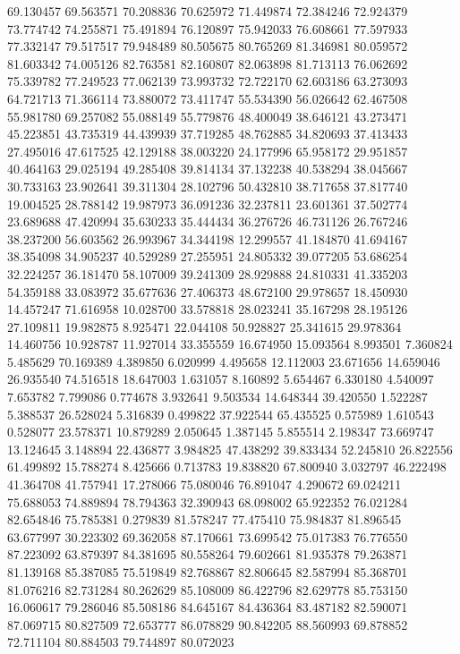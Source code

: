 69.130457
69.563571
70.208836
70.625972
71.449874
72.384246
72.924379
73.774742
74.255871
75.491894
76.120897
75.942033
76.608661
77.597933
77.332147
79.517517
79.948489
80.505675
80.765269
81.346981
80.059572
81.603342
74.005126
82.763581
82.160807
82.063898
81.713113
76.062692
75.339782
77.249523
77.062139
73.993732
72.722170
62.603186
63.273093
64.721713
71.366114
73.880072
73.411747
55.534390
56.026642
62.467508
55.981780
69.257082
55.088149
55.779876
48.400049
38.646121
43.273471
45.223851
43.735319
44.439939
37.719285
48.762885
34.820693
37.413433
27.495016
47.617525
42.129188
38.003220
24.177996
65.958172
29.951857
40.464163
29.025194
49.285408
39.814134
37.132238
40.538294
38.045667
30.733163
23.902641
39.311304
28.102796
50.432810
38.717658
37.817740
19.004525
28.788142
19.987973
36.091236
32.237811
23.601361
37.502774
23.689688
47.420994
35.630233
35.444434
36.276726
46.731126
26.767246
38.237200
56.603562
26.993967
34.344198
12.299557
41.184870
41.694167
38.354098
34.905237
40.529289
27.255951
24.805332
39.077205
53.686254
32.224257
36.181470
58.107009
39.241309
28.929888
24.810331
41.335203
54.359188
33.083972
35.677636
27.406373
48.672100
29.978657
18.450930
14.457247
71.616958
10.028700
33.578818
28.023241
35.167298
28.195126
27.109811
19.982875
8.925471
22.044108
50.928827
25.341615
29.978364
14.460756
10.928787
11.927014
33.355559
16.674950
15.093564
8.993501
7.360824
5.485629
70.169389
4.389850
6.020999
4.495658
12.112003
23.671656
14.659046
26.935540
74.516518
18.647003
1.631057
8.160892
5.654467
6.330180
4.540097
7.653782
7.799086
0.774678
3.932641
9.503534
14.648344
39.420550
1.522287
5.388537
26.528024
5.316839
0.499822
37.922544
65.435525
0.575989
1.610543
0.528077
23.578371
10.879289
2.050645
1.387145
5.855514
2.198347
73.669747
13.124645
3.148894
22.436877
3.984825
47.438292
39.833434
52.245810
26.822556
61.499892
15.788274
8.425666
0.713783
19.838820
67.800940
3.032797
46.222498
41.364708
41.757941
17.278066
75.080046
76.891047
4.290672
69.024211
75.688053
74.889894
78.794363
32.390943
68.098002
65.922352
76.021284
82.654846
75.785381
0.279839
81.578247
77.475410
75.984837
81.896545
63.677997
30.223302
69.362058
87.170661
73.699542
75.017383
76.776550
87.223092
63.879397
84.381695
80.558264
79.602661
81.935378
79.263871
81.139168
85.387085
75.519849
82.768867
82.806645
82.587994
85.368701
81.076216
82.731284
80.262629
85.108009
86.422796
82.629778
85.753150
16.060617
79.286046
85.508186
84.645167
84.436364
83.487182
82.590071
87.069715
80.827509
72.653777
86.078829
90.842205
88.560993
69.878852
72.711104
80.884503
79.744897
80.072023
